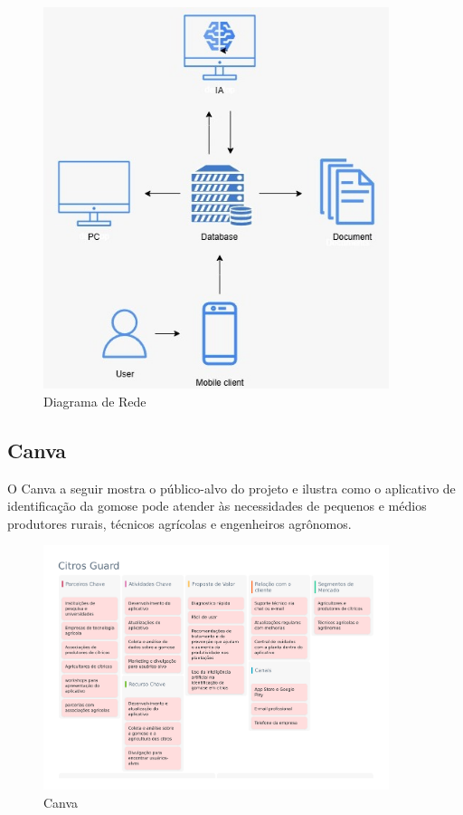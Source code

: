 \documentclass[
  a4paper,%
  12pt,%
  english,%
  brazilian,%
]{article}
\begin{document}
    \begin{figure}[h]
        \centering
        \caption{Diagrama de Rede}%
        \label{fig:diagrama-rede}
         \includegraphics[width=0.9\textwidth]{Logos/diagrama de rede.jpg}
        \end{figure}

\subsection*{Canva}

O Canva a seguir mostra o público-alvo do projeto e ilustra como o aplicativo de identificação da gomose pode atender às necessidades de pequenos e médios produtores rurais, técnicos agrícolas e engenheiros agrônomos.

\begin{figure}[h]
    \centering
    \caption{Canva}%
    \label{fig:diagrama-canva}
     \includegraphics[width=0.9\textwidth]{Logos/canvas1444650 (1).pdf}
    \end{figure}
\end{document}
